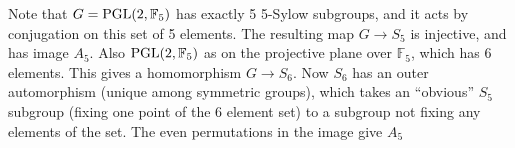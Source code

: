 \documentclass[main]{subfiles}
\begin{document}
\begin{solution}
\begin{enumerate}[label=(\alph*),leftmargin=*]
Note that $G = \operatorname{PGL}(2, \mathbb F_5)$ has exactly 5 5-Sylow subgroups, and it acts by conjugation on this set of 5 elements. The resulting map $G \to S_5$ is injective, and has image $A_5$. Also $\operatorname{PGL}(2, \mathbb F_5)$ as on the projective plane over $\mathbb F_5$, which has 6 elements. This gives a homomorphism $G \to S_6$. Now $S_6$ has an outer automorphism (unique among symmetric groups), which takes an “obvious” $S_5$ subgroup (fixing one point of the 6 element set) to a subgroup not fixing any elements of the set. The even permutations in the image give $A_5$
\end{enumerate}
\end{solution}

\begin{exercise}
\begin{enumerate}[label=(\alph*),leftmargin=*]

\end{enumerate}
\end{exercise}
\end{document}
